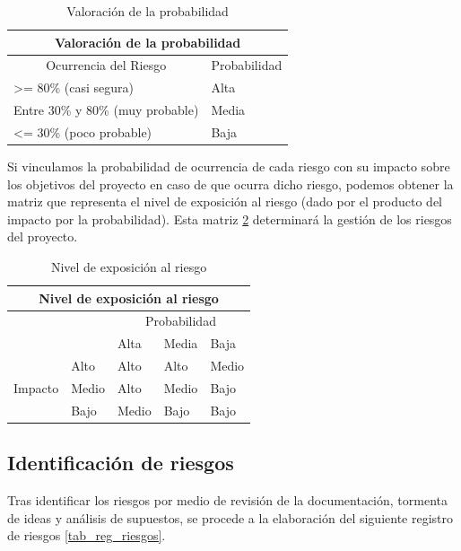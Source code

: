 \begin{table}[htpb]
\centering
\caption{Valoración de la probabilidad}
\label{tab_probabilidad}
\begin{tabular}{|l|l|}
\hline
\multicolumn{2}{|c|}{Valoración de la probabilidad} \\ \hline
\multicolumn{1}{|c|}{Ocurrencia del Riesgo}             & \multicolumn{1}{c|}{Probabilidad}  \\ \hline
\textgreater= 80\% (casi segura)  & Alta          \\ \hline
Entre 30\% y 80\% (muy probable)  & Media         \\ \hline
\textless= 30\% (poco probable)   & Baja         \\ \hline
\end{tabular}
\end{table}

Si vinculamos la probabilidad de ocurrencia de cada riesgo con su impacto sobre los objetivos del proyecto en caso de que ocurra dicho riesgo, podemos obtener la matriz que representa el nivel de exposición al riesgo (dado por el producto del impacto por la probabilidad). Esta matriz \ref{tab_riesgo} determinará la gestión de los riesgos del proyecto.

\begin{table}[htpb]
\centering
\caption{Nivel de exposición al riesgo}
\label{tab_riesgo}
\begin{tabular}{|l|l|l|l|l|}
\hline
\multicolumn{5}{|c|}{Nivel de exposición al riesgo}                         \\ \hline
\multicolumn{2}{|l|}{\multirow{2}{*}{}} & \multicolumn{3}{c|}{Probabilidad} \\ \cline{3-5} 
\multicolumn{2}{|l|}{}                  & Alta      & Media     & Baja      \\ \hline
\multirow{3}{*}{Impacto}     & Alto     & Alto      & Alto      & Medio     \\ \cline{2-5} 
                             & Medio    & Alto      & Medio     & Bajo      \\ \cline{2-5} 
                             & Bajo     & Medio     & Bajo      & Bajo      \\ \hline
\end{tabular}
\end{table}

\subsection{Identificación de riesgos}
Tras identificar los riesgos por medio  de revisión de la documentación, tormenta de ideas y análisis de supuestos, se procede a la elaboración del siguiente registro de riesgos \ref{tab_reg_riesgos}.

